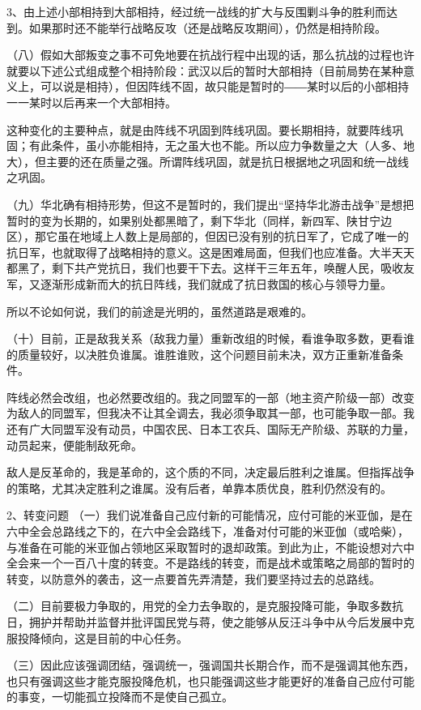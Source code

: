 3、由上述小部相持到大部相持，经过统一战线的扩大与反围剿斗争的胜利而达到。如果那时还不能举行战略反攻（还是战略反攻期间），仍然是相持阶段。

（八）假如大部叛变之事不可免地要在抗战行程中出现的话，那么抗战的过程也许就要以下述公式组成整个相持阶段：武汉以后的暂时大部相持（目前局势在某种意义上，可以说是相持），但因阵线不固，故只能是暂时的――某时以后的小部相持一一某时以后再来一个大部相持。

这种变化的主要种点，就是由阵线不巩固到阵线巩固。要长期相持，就要阵线巩固；有此条件，虽小亦能相持，无之虽大也不能。所以应力争数量之大（人多、地大），但主要的还在质量之强。所谓阵线巩固，就是抗日根据地之巩固和统一战线之巩固。

（九）华北确有相持形势，但这不是暂时的，我们提出“坚持华北游击战争”是想把暂时的变为长期的，如果别处都黑暗了，剩下华北（同样，新四军、陕甘宁边区），那它虽在地域上人数上是局部的，但因已没有别的抗日军了，它成了唯一的抗日军，也就取得了战略相持的意义。这是困难局面，但我们也应准备。大半天天都黑了，剩下共产党抗日，我们也要干下去。这样干三年五年，唤醒人民，吸收友军，又逐渐形成新而大的抗日阵线，我们就成了抗日救国的核心与领导力量。

所以不论如何说，我们的前途是光明的，虽然道路是艰难的。

（十）目前，正是敌我关系（敌我力量）重新改组的时候，看谁争取多数，更看谁的质量较好，以决胜负谁属。谁胜谁败，这个问题目前未决，双方正重新准备条件。

阵线必然会改组，也必然要改组的。我之同盟军的一部（地主资产阶级一部）改变为敌人的同盟军，但我决不让其全调去，我必须争取其一部，也可能争取一部。我还有广大同盟军没有动员，中国农民、日本工农兵、国际无产阶级、苏联的力量，动员起来，便能制敌死命。

敌人是反革命的，我是革命的，这个质的不同，决定最后胜利之谁属。但指挥战争的策略，尤其决定胜利之谁属。没有后者，单靠本质优良，胜利仍然没有的。

2、转变问题
（一）我们说准备自己应付新的可能情况，应付可能的米亚伽，是在六中全会总路线之下的，在六中全会路线下，准备对付可能的米亚伽（或哈柴），与准备在可能的米亚伽占领地区采取暂时的退却政策。到此为止，不能设想对六中全会来一个一百八十度的转变。不是路线的转变，而是战术或策略之局部的暂时的转变，以防意外的袭击，这一点要首先弄清楚，我们要坚持过去的总路线。

（二）目前要极力争取的，用党的全力去争取的，是克服投降可能，争取多数抗日，拥护并帮助并监督并批评国民党与蒋，使之能够从反汪斗争中从今后发展中克服投降倾向，这是目前的中心任务。

（三）因此应该强调团结，强调统一，强调国共长期合作，而不是强调其他东西，也只有强调这些才能克服投降危机，也只能强调这些才能更好的准备自己应付可能的事变，一切能孤立投降而不是使自己孤立。

